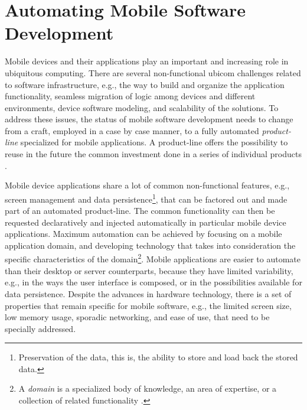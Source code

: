 \section{Automating Mobile Software Development}

Mobile devices and their applications play an important and increasing role in ubiquitous computing. There are several non-functional ubicom challenges \cite{design.ubicom.2002} related to software infrastructure, e.g., the way to build and organize the application functionality, seamless migration of logic among devices and different environments, device software modeling, and scalability of the solutions.
To address these issues, the status of mobile software development needs to change from a craft, employed in a case by case manner, to a fully automated \textit{product-line} specialized for mobile applications. A product-line offers the possibility to reuse in the future the common investment done in a series of individual products \cite{Parnas.pl.96,pl.02}.

Mobile device applications share a lot of common non-functional features, e.g., screen management and data persistence\footnote{Preservation of the data, this is, the ability to store and load back the stored data.}, that can be factored out and made part of an automated product-line. The common functionality can then be requested declaratively and injected automatically in particular mobile device applications. Maximum automation can be achieved by focusing on a mobile application domain, and developing technology that takes into consideration the specific characteristics of the domain\footnote{A \textit{domain} is a specialized body of knowledge, an area of expertise, or a collection of related functionality \cite{pl.02}.}. Mobile applications are easier to automate than their desktop or server counterparts, because they have limited variability, e.g., in the ways the user interface is composed, or in the possibilities available for data persistence. Despite the advances in hardware technology, there is a set of properties that remain specific for mobile software, e.g., the limited screen size, low memory usage, sporadic networking, and ease of use, that need to be specially addressed. 


